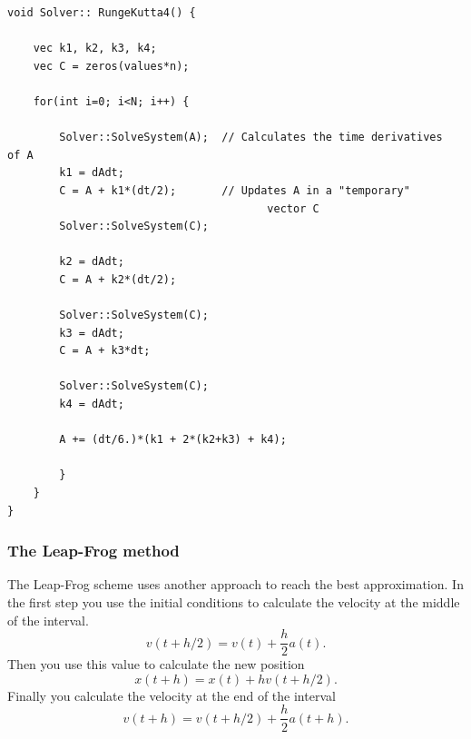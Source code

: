 \documentclass[a4paper,12pt, english]{article}
\begin{document}
 \begin{lstlisting}[title={Function RK4}]
void Solver:: RungeKutta4() {

    vec k1, k2, k3, k4;
    vec C = zeros(values*n);
 
    for(int i=0; i<N; i++) {

        Solver::SolveSystem(A);	 // Calculates the time derivatives 											of A 
        k1 = dAdt;				
        C = A + k1*(dt/2);		 // Updates A in a "temporary" 
        								vector C
        Solver::SolveSystem(C);
       
        k2 = dAdt;
        C = A + k2*(dt/2);

        Solver::SolveSystem(C);
        k3 = dAdt;
        C = A + k3*dt;

        Solver::SolveSystem(C);
        k4 = dAdt;

        A += (dt/6.)*(k1 + 2*(k2+k3) + k4);
      
        }
    }
}
\end{lstlisting} 

\subsubsection*{The Leap-Frog method}

The Leap-Frog scheme uses another approach to reach the best approximation. In the first step you use the initial conditions to calculate the velocity at the middle of the interval.
$$ v(t + h/2) = v(t) + \frac{h}{2} a(t). $$
Then you use this value to calculate the new position 
$$x(t+h) = x(t) + hv(t + h/2).$$
Finally you calculate the velocity at the end of the interval 
$$v(t+h) = v(t+h/2) + \frac{h}{2} a(t+h).$$   
\end{document}
